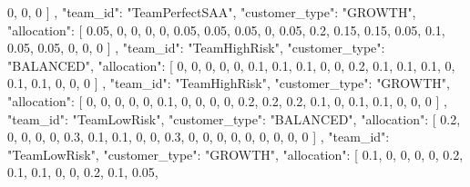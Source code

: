 {{                0,
                0,
                0
            ]
        },
        {
            "team_id": "TeamPerfectSAA",
            "customer_type": "GROWTH",
            "allocation": [
                0.05,
                0,
                0,
                0,
                0,
                0.05,
                0.05,
                0.05,
                0,
                0.05,
                0.2,
                0.15,
                0.15,
                0.05,
                0.1,
                0.05,
                0.05,
                0,
                0,
                0
            ]
        },
        {
            "team_id": "TeamHighRisk",
            "customer_type": "BALANCED",
            "allocation": [
                0,
                0,
                0,
                0,
                0,
                0.1,
                0.1,
                0.1,
                0,
                0,
                0.2,
                0.1,
                0.1,
                0.1,
                0,
                0.1,
                0.1,
                0,
                0,
                0
            ]
        },
        {
            "team_id": "TeamHighRisk",
            "customer_type": "GROWTH",
            "allocation": [
                0,
                0,
                0,
                0,
                0,
                0.1,
                0,
                0,
                0,
                0,
                0.2,
                0.2,
                0.2,
                0.1,
                0,
                0.1,
                0.1,
                0,
                0,
                0
            ]
        },
        {
            "team_id": "TeamLowRisk",
            "customer_type": "BALANCED",
            "allocation": [
                0.2,
                0,
                0,
                0,
                0,
                0.3,
                0.1,
                0.1,
                0,
                0,
                0.3,
                0,
                0,
                0,
                0,
                0,
                0,
                0,
                0,
                0
            ]
        },
        {
            "team_id": "TeamLowRisk",
            "customer_type": "GROWTH",
            "allocation": [
                0.1,
                0,
                0,
                0,
                0,
                0.2,
                0.1,
                0.1,
                0,
                0,
                0.2,
                0.1,
                0.05,
}}
